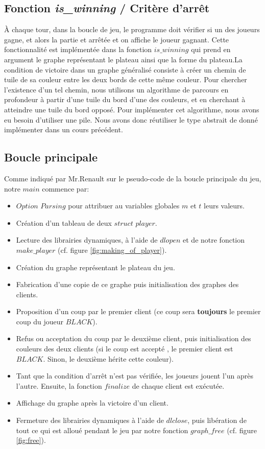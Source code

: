 \documentclass{article}
\begin{document}
\subsection{Fonction \textit{is\_winning} / Critère d'arrêt}
 \`A chaque tour, dans la boucle de jeu, le programme doit vérifier si un des joueurs gagne, et alors la partie et arrêtée et on affiche le joueur gagnant. Cette fonctionnalité est implémentée dans la fonction $is\_winning$ qui prend en argument le graphe représentant le plateau ainsi que la forme du plateau.La condition de victoire dans un graphe généralisé consiste à créer un chemin de tuile de sa couleur entre les deux bords de cette même couleur. Pour chercher l'existence d'un tel chemin, nous utilisons un algorithme de parcours en profondeur à partir d'une tuile du bord d'une des couleurs, et en cherchant à atteindre une tuile du bord opposé. Pour implémenter cet algorithme, nous avons eu besoin d'utiliser une pile. Nous avons donc réutiliser le type abstrait de donné implémenter dans un cours précédent.

\subsection{Boucle principale}
Comme indiqué par Mr.Renault sur le pseudo-code de la boucle principale du jeu, notre $main$ commence par:
\begin{itemize}
    \item $Option$ $Parsing$ pour attribuer au variables globales $m$ et $t$ leurs valeurs.
    \item Création d'un tableau de deux $struct$ $player$.
    \item Lecture des librairies dynamiques, à l'aide de $dlopen$ et de notre fonction $make\_player$ (cf. figure \ref{fig:making_of_player}).
    \item Création du graphe représentant le plateau du jeu.
    \item Fabrication d'une copie de ce graphe puis initialisation des graphes des clients.
    \item Proposition d'un coup par le premier client (ce coup sera \textbf{toujours} le premier coup du joueur $BLACK$).
    \item Refus ou acceptation du coup par le deuxième client, puis initialisation des couleurs des deux clients (si le coup est accepté , le premier client est $BLACK$. Sinon, le deuxième hérite cette couleur).
    \item Tant que la condition d'arrêt n'est pas vérifiée, les joueurs jouent l'un après l'autre. Ensuite, la fonction $finalize$ de chaque client est exécutée.
    \item Affichage du graphe après la victoire d'un client.
    \item Fermeture des librairies dynamiques à l'aide de $dlclose$, puis libération de tout ce qui est alloué pendant le jeu par notre fonction $graph\_free$ (cf. figure \ref{fig:free}). 
    
\end{itemize}
\end{document}
